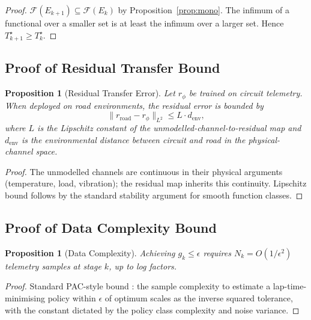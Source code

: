 \documentclass[11pt,twocolumn]{article}
\newtheorem{proposition}[theorem]{Proposition}
\theoremstyle{definition}
\theoremstyle{remark}
\newcommand{\Feas}{\mathcal{F}}
\begin{document}
\begin{proof}
$\Feas(E_{k+1}) \subseteq \Feas(E_k)$ by Proposition~\ref{prop:mono}. The infimum of a functional over a smaller set is at least the infimum over a larger set. Hence $T^{\star}_{k+1} \ge T^{\star}_k$.
\end{proof}

\subsection{Proof of Residual Transfer Bound}

\begin{proposition}[Residual Transfer Error]\label{prop:trans-bound}
Let $r_\phi$ be trained on circuit telemetry. When deployed on road environments, the residual error is bounded by
\begin{equation}
\|r_{\mathrm{road}} - r_\phi\|_{L^2} \le L \cdot d_{\mathrm{env}},
\end{equation}
where $L$ is the Lipschitz constant of the unmodelled-channel-to-residual map and $d_{\mathrm{env}}$ is the environmental distance between circuit and road in the physical-channel space.
\end{proposition}

\begin{proof}
The unmodelled channels are continuous in their physical arguments (temperature, load, vibration); the residual map inherits this continuity. Lipschitz bound follows by the standard stability argument for smooth function classes.
\end{proof}

\subsection{Proof of Data Complexity Bound}

\begin{proposition}[Data Complexity]\label{prop:data-comp}
Achieving $g_k \le \epsilon$ requires $N_k = O(1/\epsilon^2)$ telemetry samples at stage $k$, up to log factors.
\end{proposition}

\begin{proof}
Standard PAC-style bound \cite{wasserman2013all,bartlett2002rademacher}: the sample complexity to estimate a lap-time-minimising policy within $\epsilon$ of optimum scales as the inverse squared tolerance, with the constant dictated by the policy class complexity and noise variance.
\end{proof}
\end{document}
